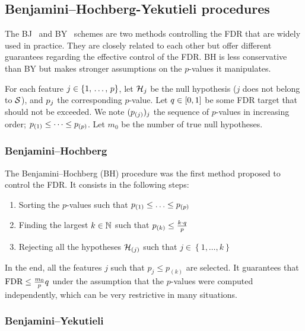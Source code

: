 \subsection{Benjamini–Hochberg-Yekutieli procedures}\label{subsec:bhq}

The BJ~\citep{bh} and BY~\citep{by} schemes are two methods controlling the FDR
that are widely used in practice.
They are closely related to each other but offer different guarantees regarding the effective control of the FDR\@.
BH is less conservative than BY but makes stronger assumptions on the $p$-values it manipulates.

For each feature $j \in \left\{ 1,\, \dots,\, p \right\}$, let $\mathcal{H}_j$ be the null hypothesis ($j$ does not belong to $\mathcal{S}$),
and $p_j$ the corresponding $p$-value.
Let $q \in [0, 1]$ be some FDR target that should not be exceeded.
We note $(p_{(j)})_j$ the sequence of $p$-values in increasing order;
$p_{(1)} \leq \dots \leq p_{(p)}$.
Let $m_0$ be the number of true null hypotheses.

\subsubsection{Benjamini–Hochberg}\label{subsubsec:bh}

The Benjamini–Hochberg (BH) procedure was the first method proposed to control the FDR\@.
It consists in the following steps:
\begin{enumerate}
    \item Sorting the $p$-values such that $p_{(1)} \leq \ldots \leq p_{(p)}$
    \item Finding the largest $k \in \mathbb{N}$ such that $p_{(k)} \leq \frac{k \cdot q}{p}$
    \item Rejecting all the hypotheses $\mathcal{H}_{(j)}$ such that $j \in \left\{ 1, \dots, k \right\}$
\end{enumerate}
In the end, all the features $j$ such that $p_j \leq p_{(k)}$ are selected.
It guarantees that $\text{FDR} \leq \frac{m_0}{p}q$ under the assumption that the $p$-values were computed
independently, which can be very restrictive in many situations.

\subsubsection{Benjamini–Yekutieli}\label{subsubsec:by}

